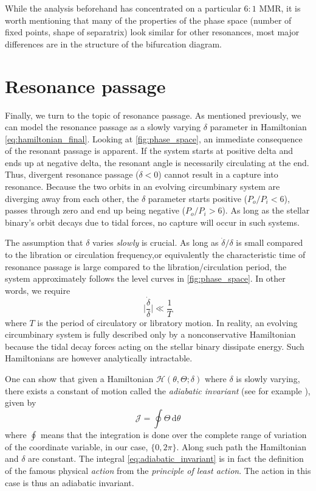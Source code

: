 \documentclass[ twoside,openright,titlepage,numbers=noenddot,headinclude,%
                footinclude=true,cleardoublepage=empty,abstractoff, %
                BCOR=5mm,paper=a4,fontsize=11pt,%
                american,%
                ]{scrreprt}
\begin{document}
While the analysis beforehand has concentrated on a particular $6:1$ MMR, it is 
worth mentioning 
that many of the properties of the phase space (number of fixed points, shape of
separatrix) look similar for other 
resonances, most major differences are in the structure of the bifurcation diagram.

\section{Resonance passage}
\label{sec:Resonance_passage}
Finally, we turn to the topic of resonance passage. As mentioned previously, we
can model the resonance passage as a slowly varying $\delta$ parameter in Hamiltonian 
\ref{eq:hamiltonian_final}. 
Looking at \cref{fig:phase_space}, an immediate consequence of the resonant
passage is apparent. If the system starts at positive delta and ends up at
negative delta, the resonant angle is necessarily circulating at the end. 
Thus, divergent
resonance passage ($\dot{\delta}<0$) cannot result in a capture into resonance.
Because the two orbits in an evolving circumbinary system
are diverging away from each other, the $\delta$ parameter starts positive 
($P_o/P_i<6$), passes through zero and end up being negative ($P_o/P_i>6$).
As long as the stellar binary's orbit decays due to tidal forces, no capture 
will occur in such systems.

The assumption that $\delta$ varies \emph{slowly} is crucial. As long as
$\dot{\delta}/\delta$ is small compared to the libration or circulation 
frequency,or equivalently the characteristic time of resonance passage
is large compared to the libration/circulation period, the system 
approximately follows the level curves in \cref{fig:phase_space}. In 
other words, we require 
\begin{equation}
    \bigg\lvert\frac{\dot{\delta}}{\delta}\bigg\rvert \ll \frac{1}{T} 
    \label{eq:adabatic_criterion}
\end{equation}
where $T$ is the period of circulatory or libratory motion.
In reality, an evolving circumbinary system is fully 
described only by a nonconservative Hamiltonian because the tidal decay
forces acting on the stellar binary dissipate energy. Such Hamiltonians
are however analytically intractable.

One can show that given a Hamiltonian $\mathcal{H}(\theta,\Theta;\delta)$
where $\delta$ is slowly varying, there exists a constant of motion
called the \emph{adiabatic invariant} (see for example \cite{landau}),
given by
\begin{equation}
    \mathcal{J}=\oint \Theta\,\mathrm{d}\theta    
    \label{eq:adiabatic_invariant}
\end{equation}
where $\oint$ means that the integration is done over the complete range
of variation of the coordinate variable, in our case, $\{0,2\pi\}$. Along
such  path the Hamiltonian and $\delta$ are constant. The integral
\ref{eq:adiabatic_invariant} is in fact the definition of the famous
physical \emph{action} from the \emph{principle of least action}. The action
in this case is thus an adiabatic invariant.
\end{document}
